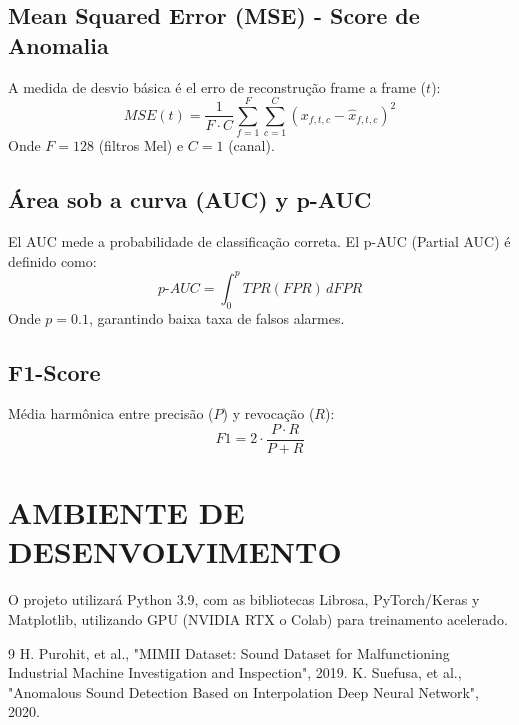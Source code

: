 \documentclass{article}
\begin{document}
\subsection{Mean Squared Error (MSE) - Score de Anomalia}
\label{ssec:mse}

A medida de desvio básica é el erro de reconstrução frame a frame ($t$):
\begin{equation}
MSE(t) = \frac{1}{F \cdot C} \sum_{f=1}^{F} \sum_{c=1}^{C} (x_{f,t,c} - \hat{x}_{f,t,c})^2
\end{equation}
Onde $F=128$ (filtros Mel) e $C=1$ (canal).

\subsection{Área sob a curva (AUC) y p-AUC}
\label{ssec:pauc}

El AUC mede a probabilidade de classificação correta. El p-AUC (Partial AUC) é definido como:
\begin{equation}
p\text{-}AUC = \int_{0}^{p} TPR(FPR) \, dFPR
\end{equation}
Onde $p=0.1$, garantindo baixa taxa de falsos alarmes.

\subsection{F1-Score}
\label{ssec:f1}

Média harmônica entre precisão ($P$) y revocação ($R$):
\begin{equation}
F1 = 2 \cdot \frac{P \cdot R}{P + R}
\end{equation}

\section{AMBIENTE DE DESENVOLVIMENTO}
\label{sec:env}

O projeto utilizará Python 3.9, com as bibliotecas Librosa, PyTorch/Keras y Matplotlib, utilizando GPU (NVIDIA RTX o Colab) para treinamento acelerado.

\vfill\pagebreak

\begin{thebibliography}{9}
H. Purohit, et al., "MIMII Dataset: Sound Dataset for Malfunctioning Industrial Machine Investigation and Inspection", 2019.
K. Suefusa, et al., "Anomalous Sound Detection Based on Interpolation Deep Neural Network", 2020.
\end{thebibliography}
\end{document}

